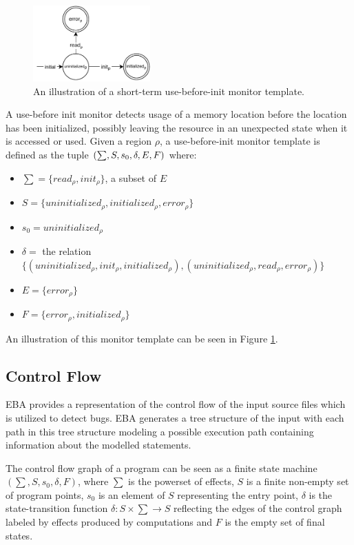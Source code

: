 \begin{figure}[H]
    \centering
    \includegraphics[width=0.4\textwidth]{algorithm/figures/use-before}
    \caption{An illustration of a short-term use-before-init monitor template.}
    \label{use-before-automata}
\end{figure}

A use-before init monitor detects usage of a memory location before the location has been initialized, possibly leaving the resource in an unexpected state when it is accessed or used. Given a region $\rho$, a use-before-init monitor template is defined as the tuple $(\sum, S, s_0, \delta, E, \\F)$ where: 

\begin{itemize}
    \item $\sum = \{read_\rho, init_\rho\}$, a subset of $E$
    \item $S = \{ uninitialized_\rho, initialized_\rho, error_\rho \}$
    \item $s_0 = uninitialized_\rho$ 
    \item $\delta =$ the relation $\{(uninitialized_\rho, init_\rho, initialized_\rho), (uninitialized_\rho, read_\rho, error_\rho)\}$ 
    \item $E = \{ error_\rho \}$  
    \item $F = \{ error_\rho, initialized_\rho \}$
\end{itemize}

An illustration of this monitor template can be seen in Figure \ref{use-before-automata}. 

\subsection{Control Flow}

EBA provides a representation of the control flow of the input source files which is utilized to detect bugs. EBA generates a tree structure of the input with each path in this tree structure modeling a possible execution path containing information about the modelled statements. 

\newpar The control flow graph of a program can be seen as a finite state machine $(\sum, S, s_0, \delta, F)$, where $\sum$ is the powerset of effects, $S$ is a finite non-empty set of program points, $s_0$ is an element of $S$ representing the entry point, $\delta$ is the state-transition function $\delta: S \times \sum \rightarrow S$ reflecting the edges of the control graph labeled by effects produced by computations and $F$ is the empty set of final states. 

